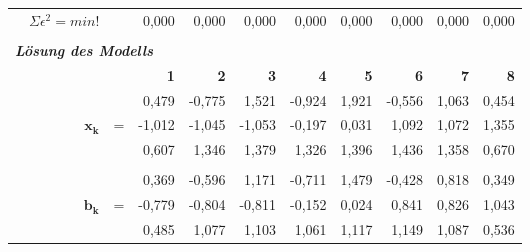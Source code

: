 \begin{table}[h]
\begin{tabular}{r|rrr|r|r|r|r|rrr}
    \multicolumn{1}{r}{} & $\Sigma\epsilon^2=min!$ &       & \multicolumn{1}{r}{0,000} & \multicolumn{1}{r}{0,000} & \multicolumn{1}{r}{0,000} & \multicolumn{1}{r}{0,000} & \multicolumn{1}{r}{0,000} & 0,000 & 0,000 & 0,000 \\
    \multicolumn{1}{r}{} &       &       & \multicolumn{1}{r}{} & \multicolumn{1}{r}{} & \multicolumn{1}{r}{} & \multicolumn{1}{r}{} & \multicolumn{1}{r}{} &       &       &  \\
    \multicolumn{11}{l}{\textit{\textbf{Lösung des Modells}}} \\
    \multicolumn{1}{r}{} &       &       & \multicolumn{1}{r}{\textbf{1}} & \multicolumn{1}{r}{\textbf{2}} & \multicolumn{1}{r}{\textbf{3}} & \multicolumn{1}{r}{\textbf{4}} & \multicolumn{1}{r}{\textbf{5}} & \textbf{6} & \textbf{7} & \textbf{8} \\
\cline{2-11}    \multicolumn{1}{r}{} &       &       & \multicolumn{1}{r}{0,479} & \multicolumn{1}{r}{-0,775} & \multicolumn{1}{r}{1,521} & \multicolumn{1}{r}{-0,924} & \multicolumn{1}{r}{1,921} & -0,556 & 1,063 & 0,454\\
    \multicolumn{1}{r}{} & $\mathbf{x_k}$ & =     & \multicolumn{1}{r}{-1,012} & \multicolumn{1}{r}{-1,045} & \multicolumn{1}{r}{-1,053} & \multicolumn{1}{r}{-0,197} & \multicolumn{1}{r}{0,031} & 1,092 & 1,072 & 1,355 \\
    \multicolumn{1}{r}{} &       &       & \multicolumn{1}{r}{0,607} & \multicolumn{1}{r}{1,346} & \multicolumn{1}{r}{1,379} & \multicolumn{1}{r}{1,326} & \multicolumn{1}{r}{1,396} & 1,436 & 1,358 & 0,670 \\
    \multicolumn{1}{r}{} &       &       & \multicolumn{1}{r}{} & \multicolumn{1}{r}{} & \multicolumn{1}{r}{} & \multicolumn{1}{r}{} & \multicolumn{1}{r}{} &       &       &  \\
    \multicolumn{1}{r}{} &       &       & \multicolumn{1}{r}{0,369} & \multicolumn{1}{r}{-0,596} & \multicolumn{1}{r}{1,171} & \multicolumn{1}{r}{-0,711} & \multicolumn{1}{r}{1,479} & -0,428 & 0,818 & 0,349 \\
    \multicolumn{1}{r}{} & $\mathbf{b_k}$ & =     & \multicolumn{1}{r}{-0,779} & \multicolumn{1}{r}{-0,804} & \multicolumn{1}{r}{-0,811} & \multicolumn{1}{r}{-0,152} & \multicolumn{1}{r}{0,024} & 0,841 & 0,826 & 1,043 \\
    \multicolumn{1}{r}{} &       &       & \multicolumn{1}{r}{0,485} & \multicolumn{1}{r}{1,077} & \multicolumn{1}{r}{1,103} & \multicolumn{1}{r}{1,061} & \multicolumn{1}{r}{1,117} & 1,149 & 1,087 & 0,536 \\

\end{tabular}
\end{table}
